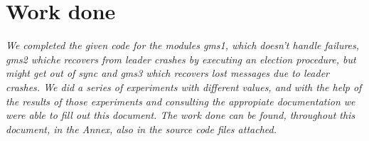 \section{Work done}
\textit{We completed the given code for the modules gms1, which doesn't handle failures, gms2 whiche recovers from leader crashes by executing an election procedure, but might get out of sync and gms3 which recovers lost messages due to leader crashes. We  did a series of experiments
with different values, and with the help of the results of those
experiments and consulting the appropiate documentation we were able to fill out this
document. The work done can be found, throughout this document, in the Annex, also in
the source code files attached.}